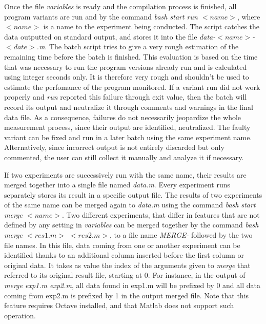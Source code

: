 Once the file \emph{variables} is ready and the compilation process is finished, all program variants are run and by the command \emph{bash start run $<name>$}, where $<name>$ is a name to the experiment being conducted. The script catches the data outputted on standard output, and stores it into the file \emph{data-$<name>$-$<date>$.m}. The batch script tries to give a very rough estimation of the remaining time before the batch is finished. This evaluation is based on the time that was necessary to run the program versions already run and is calculated using integer seconds only. It is therefore very rough and shouldn't be used to estimate the perfomance of the program monitored. If a variant run did not work properly and \emph{run} reported this failure through exit value, then the batch will record its output and neutralize it through comments and warnings in the final data file. As a consequence, failures do not necessarily jeopardize the whole measurement process, since their output are identified, neutralized. The faulty variant can be fixed and run in a later batch using the same experiment name. Alternatively, since incorrect output is not entirely discarded but only commented, the user can still collect it manually and analyze it if necessary.

If two experiments are successively run with the same name, their results are merged together into a single file named \emph{data.m}. Every experiment runs separately stores its result in a specific output file. The results of two experiments of the same name can be merged again to \emph{data.m} using the command \emph{bash start merge $<name>$}. Two different experiments, that differ in features that are not defined by any setting in \emph{variables} can be merged together by the command \emph{bash merge $<res1.m>$ $<res2.m>$}, to a file name \emph{MERGE-} followed by the two file names. In this file, data coming from one or another experiment can be identified thanks to an additional column inserted before the first column or original data. It takes as value the index of the arguments given to \emph{merge} that referred to its original result file, starting at 0. For instance, in the output of \emph{merge exp1.m exp2.m}, all data found in exp1.m will be prefixed by 0 and all data coming from exp2.m is prefixed by 1 in the output merged file. Note that this feature requires Octave installed, and that Matlab does not support such operation.

